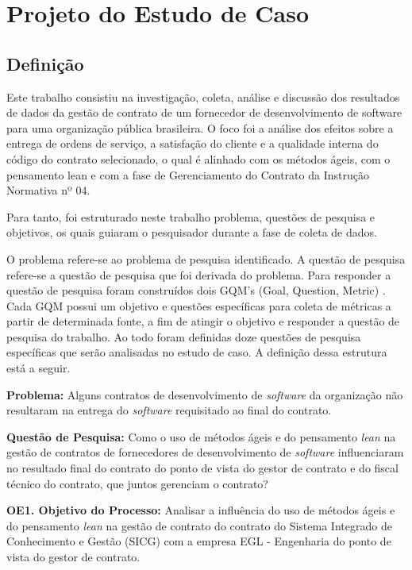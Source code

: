 \section{Projeto do Estudo de Caso}
\label{sec:projeto}


\subsection{Definição}

Este trabalho consistiu na investigação, coleta, análise e discussão dos resultados de dados da gestão de contrato de um fornecedor de desenvolvimento
 de software para uma organização pública brasileira. O foco foi a análise dos efeitos sobre a entrega de ordens de serviço, a satisfação do cliente e a qualidade interna do código
 do contrato selecionado, o qual é alinhado com os métodos ágeis, com
 o pensamento lean e com a fase de Gerenciamento do Contrato da Instrução Normativa
 nº 04.

Para tanto, foi estruturado neste trabalho problema, questões de pesquisa e objetivos, os quais guiaram o pesquisador durante a fase de coleta de dados.


O problema refere-se ao problema de pesquisa identificado. A questão de pesquisa refere-se a questão de pesquisa que foi derivada do problema. Para responder a questão de pesquisa foram construídos dois GQM's (Goal, Question, Metric) \cite{gqm}. Cada GQM possui um objetivo e questões específicas para coleta de métricas a partir de determinada fonte, a fim de atingir o objetivo e responder a questão de pesquisa do trabalho. Ao todo foram definidas doze questões de pesquisa específicas que serão analisadas no estudo de caso. A definição dessa estrutura está a seguir.


\textbf{Problema:} Alguns contratos de desenvolvimento de \textit{software} da organização não resultaram na entrega do \textit{software} requisitado ao final do contrato.

\textbf{Questão de Pesquisa:} Como o uso de métodos ágeis e do pensamento \textit{lean} na gestão de contratos de fornecedores de desenvolvimento de \textit{software} influenciaram no resultado final do contrato do ponto de vista do gestor de contrato e do fiscal técnico do contrato, que juntos gerenciam o contrato?


\textbf{OE1. Objetivo do Processo:} Analisar a influência do uso de métodos ágeis e do pensamento \textit{lean} na gestão de contrato do contrato do Sistema Integrado de Conhecimento e Gestão (SICG) com a empresa EGL - Engenharia do ponto de vista do gestor de contrato.

